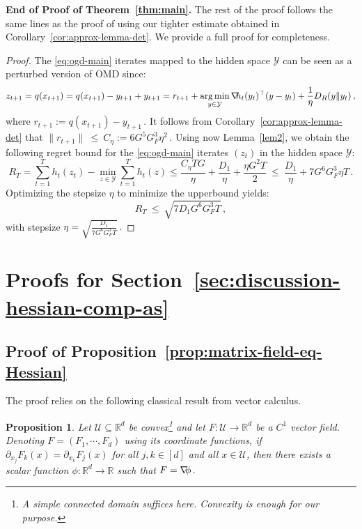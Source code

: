 \documentclass[a4paper,11pt,fullpage]{article}
\def\Y{{\mathcal Y}}
\theoremstyle{plain}
\newtheorem{proposition}{Proposition}
\theoremstyle{definition}
\theoremstyle{plain}
\DeclareMathOperator*{\argmin}{arg\,min}
\renewcommand{\leq}{~\le~}
\let\nablaold\nabla
\renewcommand{\nabla}{\nablaold\mkern-2.5mu}
\begin{document}
\noindent\textbf{End of Proof of Theorem~\ref{thm:main}.} 
The rest of the proof follows the same lines as the proof of \citet{ghai-lu-hazan22} using our tighter estimate obtained in Corollary~\ref{cor:approx-lemma-det}. We provide a full proof for completeness. 
\begin{proof}
The \eqref{eq:ogd-main} iterates mapped to the hidden space $\Y$ can be seen as a perturbed version of OMD since: 
\begin{equation*}
z_{t+1} = q(x_{t+1}) = q(x_{t+1}) - y_{t+1} + y_{t+1} = r_{t+1} + \argmin_{y\in \Y} \nabla h_t(y_t)^{\top}(y-y_t) +\frac{1}{\eta} D_R(y\|y_t)\,, 
\end{equation*}
where $r_{t+1} := q(x_{t+1}) - y_{t+1}\,.$ It follows from Corollary~\ref{cor:approx-lemma-det} that $\|r_{t+1}\| \leq C_{\eta} := 6 G^5 G_F^3 \eta^2\,.$ Using now Lemma~\ref{lem2}, we obtain the following regret bound for the \eqref{eq:ogd-main} iterates $(z_t)$ in the hidden space $\Y$:
\begin{equation*}
R_T = \sum_{t=1}^T h_t(z_t) - \min_{z\in\Y}\sum_{t=1}^T h_t(z) \le \frac{C_{\eta} T G}{\eta} + \frac{D_1}{\eta} +\frac{\eta G^2 T}{2} 
\leq \frac{D_1}{\eta} + 7 G^6 G_F^3  \eta T\,.
\end{equation*}
Optimizing the stepsize $\eta$ to minimize the upperbound yields: 
\begin{equation*}
R_T \leq \sqrt{7 D_1 G^6 G_F^3 T}\,, 
\end{equation*}
with stepsize $\eta = \sqrt{\frac{D_1}{7 G^6 G_F^3 T}}\,.$ 
\end{proof}

\section{Proofs for Section~\ref{sec:discussion-hessian-comp-as}}

\subsection{Proof of Proposition~\ref{prop:matrix-field-eq-Hessian}}

The proof relies on the following classical result from vector calculus. 
\begin{tcolorbox}[colframe=white!, top=2pt,left=2pt,right=2pt,bottom=2pt] 
\begin{proposition}
\label{prop:existence-grad-potential}
Let $\mathcal{U} \subseteq \mathbb{R}^d$ be convex\footnote{A simple connected domain suffices here. Convexity is enough for our purpose.} and let $F: \mathcal{U} \to \mathbb{R}^d $ be a $C^1$ vector field. Denoting $F = (F_1, \cdots, F_d)$ using its coordinate functions, if $\partial_{x_j} F_k(x) = \partial_{x_k} F_j(x)$ for all $j,k \in [d]$ and all $x \in \mathcal{U}$, then there exists a scalar function $\phi: \mathbb{R}^d \to \mathbb{R}$ such that $F = \nabla \phi\,.$ 
\end{proposition}
\end{tcolorbox}
\end{document}
